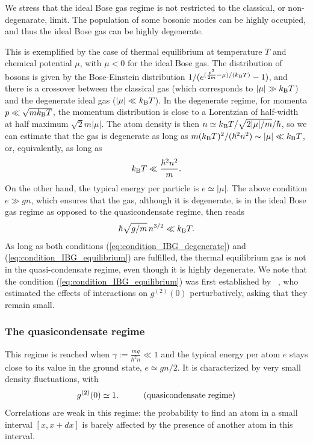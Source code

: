\documentclass[onecolumn,amsfonts,showpacs,superscriptaddress]{revtex4-1}
\begin{document}
We stress that the ideal Bose gas regime  is not restricted to the classical, or non-degenarate, limit. The population of some bosonic modes can be highly occupied, and thus the ideal Bose gas can be highly degenerate.

This is exemplified by the case of thermal equilibrium at temperature $T$ and chemical potential $\mu$, with $\mu <0$ for the ideal Bose gas. The distribution of bosons is given by the Bose-Einstein distribution $1/(e^{(\frac{p^2}{2m}-\mu)/(k_{\rm B} T)}-1)$, and there is a crossover between the classical gas (which corresponds to $|\mu|\gg k_{\rm B}T$) and the degenerate ideal gas ($|\mu|\ll k_{\rm B}T$). In the degenerate regime, for momenta $p\ll \sqrt{m k_{\rm B} T}$, the momentum distribution is close to a Lorentzian of half-width at half maximum  $\sqrt{2}m |\mu|$. The atom density is then $n\simeq 
k_{\rm B}T/\sqrt{2|\mu|/m}/\hbar$, so we can estimate that the gas is degenerate as long as $m (k_{\rm B} T)^2/(\hbar^2 n^2) \sim |\mu| \ll k_{\rm B}T$, or, equivalently, as long as
\begin{equation}
    \label{eq:condition_IBG_degenerate}
      k_{\rm B} T \ll \frac{\hbar^2 n^2}{m} .
\end{equation}
On the other hand, the typical energy per particle is $e\simeq |\mu|$. The above condition $e\gg g n$, which ensures that the gas, although it is degenerate, is in the ideal Bose gas regime as opposed to the quasicondensate regime, then reads
\begin{equation}
    \label{eq:condition_IBG_equilibrium}
    \hbar \sqrt{g/m} \, n^{3/2} \ll k_{\rm B} T .
\end{equation}
As long as both conditions (\ref{eq:condition_IBG_degenerate}) and (\ref{eq:condition_IBG_equilibrium}) are fulfilled, the thermal equilibrium gas is not in the quasi-condensate regime, even though it is highly degenerate. We note that the condition (\ref{eq:condition_IBG_equilibrium}) was first established by ~\cite{kheruntsyan2003pair}, who estimated the effects of interactions on $g^{(2)}(0)$ perturbatively, asking that they remain small.


\subsubsection{The quasicondensate regime}
This regime is reached when $\gamma := \frac{m g}{\hbar^2 n} \ll 1$ and 
the typical energy per atom $e$ stays close to its value in the ground state, $e \simeq gn/2$.
It is characterized by very small density fluctuations, with
\begin{equation}
    \label{eq:g2_quasicondensate}
    g^{(2)}(0) \simeq 1 . \qquad \quad ({\rm quasicondensate \; regime})
\end{equation}
Correlations are weak in this regime: the probability to find an atom in a small interval $[x, x+ d x]$ is barely affected by the presence of another atom in this interval.
\end{document}
